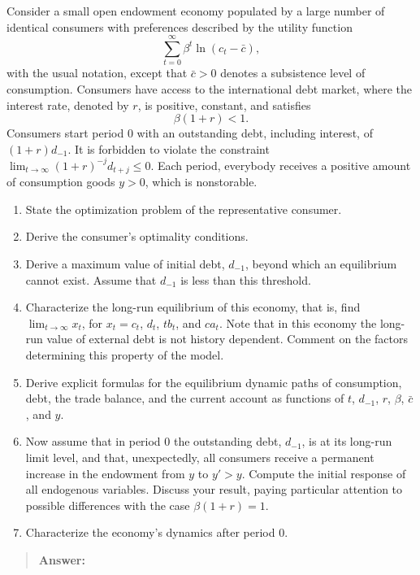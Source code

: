 \begin{exercise}   Consider a small open endowment economy populated by a large number of identical consumers with preferences described by the utility function
\[
\sum_{t=0}^{\infty} \beta^t
\ln(c_t-\bar{c}),
\]
with the usual notation, except that  $\bar{c}>0$ denotes a subsistence level of consumption. 
Consumers  have access to the international debt market, where the interest rate, denoted by $r$,  is positive,  constant, and 
satisfies
\[
\beta(1+r)<1.
\]
Consumers start period 0 with an outstanding debt, including interest,  of $(1+r)d_{-1}$. It is  forbidden to 
violate the constraint $\lim_{t\rightarrow \infty}(1+r)^{-j}d_{t+j}\le 0$. Each period, everybody receives a positive amount of  consumption goods $y>0$, which is nonstorable. 

\begin{enumerate}
\item State the optimization problem of the representative consumer.
\item Derive the consumer's optimality conditions.
\item Derive  a maximum value of initial debt, $d_{-1}$, beyond which an equilibrium cannot exist.  
Assume that $d_{-1}$ is less than this threshold. 
\item Characterize the long-run equilibrium of this economy, that is, find $\lim_{t\rightarrow \infty} x_t$, for  $x_t=c_t$, $d_t$, $tb_t$,  and $ca_t$. Note that in this economy  the long-run value of  external debt is not history dependent.  Comment on the factors determining this   property of the model. 
\item Derive explicit formulas for the equilibrium dynamic paths of  consumption, debt, the trade balance, and the current account as functions of $t$, $d_{-1}$, $r$, $\beta$, $\bar{c}$, and $y$. 
\item Now assume that 
in period 0 the outstanding debt, $d_{-1}$,
is at its long-run limit level, and that,  unexpectedly, all consumers  receive a permanent increase in the endowment from $y$ to $y'>y$. Compute the initial response of all endogenous variables.  Discuss your result, paying particular attention to possible differences with the case $\beta(1+r)=1$. 
\item Characterize the economy's dynamics after period 0.
\end{enumerate}

\begin{quote}
{\bf Answer: }



\end{quote}
\end{exercise}

